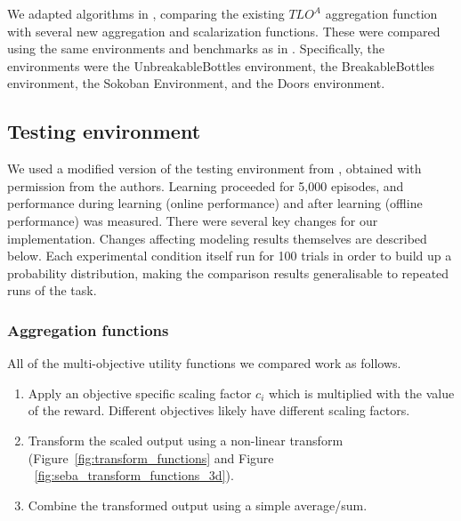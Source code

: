 We adapted algorithms in \cite{vamplew_potential-based_2021}, comparing the existing $TLO^A$ aggregation function with several new aggregation and scalarization functions. These were compared using the same environments and benchmarks as in \cite{vamplew_potential-based_2021}. Specifically, the environments were the UnbreakableBottles environment, the BreakableBottles environment, the Sokoban Environment, and the Doors environment.
\subsection{Testing environment}

We used a modified version of the testing environment from \cite{vamplew_potential-based_2021}, obtained with permission from the authors. Learning proceeded for 5,000 episodes, and performance during learning (online performance) and after learning (offline performance) was measured. There were several key changes for our implementation. Changes affecting modeling results themselves are described below. Each experimental condition itself run for 100 trials in order to build up a probability distribution, making the comparison results generalisable to repeated runs of the task.



\subsubsection{Aggregation functions}



All of the multi-objective utility functions we compared work as follows. 
\begin{enumerate}

    \item Apply an objective specific scaling factor $c_i$ which is multiplied with the value of the reward. Different objectives likely have different scaling factors.  
    \item Transform the scaled output using a non-linear transform (Figure~\ref{fig:transform_functions} and Figure ~\ref{fig:seba_transform_functions_3d}). %
    
    \item Combine the transformed output using a simple average/sum.
\end{enumerate}


